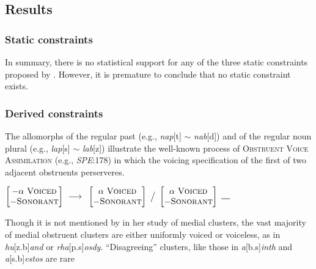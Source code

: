 \subsection{Results}

\subsubsection{Static constraints}

In summary, there is no statistical support for any of the three static constraints proposed by \citeauthor{Pierrehumbert1994}. However, it is premature to conclude that no static constraint exists. 


\subsubsection{Derived constraints}

The allomorphs of the regular past (e.g., \emph{nap}[t] $\sim$ \emph{nab}[d]) and of the regular noun plural (e.g., \emph{lap}[s] $\sim$ \emph{lab}[z]) illustrate the well-known process of \textsc{Obstruent Voice Assimilation} (e.g., \emph{SPE}:178) in which the voicing specification of the first of two adjacent obstruents perserveres. 

\begin{example}
$\begin{bmatrix} -\alpha~\textsc{Voiced} \\ -\textsc{Sonorant} \end{bmatrix}~\goesto{}~\begin{bmatrix} \alpha~\textsc{Voiced} \\ -\textsc{Sonorant} \end{bmatrix}~\big /~\begin{bmatrix} \alpha~\textsc{Voiced} \\ -\textsc{Sonorant} \end{bmatrix}~\gap{}$
\end{example}

Though it is not mentioned by \citet{Pierrehumbert1994} in her study of medial clusters, the vast majority of medial obstruent clusters are either uniformly voiced or voiceless, as in \emph{hu}[z.b]\emph{and} or \emph{rha}[p.s]\emph{osdy}. ``Disagreeing'' clusters, like those in \emph{a}[b.s]\emph{inth} and \emph{a}[s.b]\emph{estos} are rare

